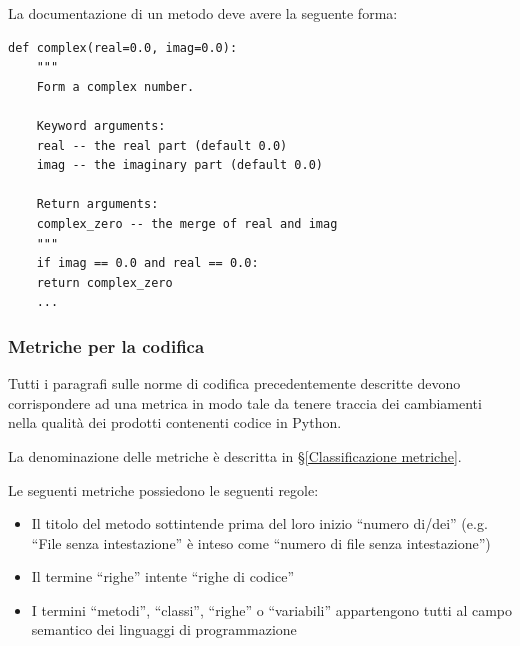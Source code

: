         La documentazione di un metodo deve avere la seguente forma:
\begin{verbatim}
def complex(real=0.0, imag=0.0):
    """
    Form a complex number.

    Keyword arguments:
    real -- the real part (default 0.0)
    imag -- the imaginary part (default 0.0)

    Return arguments:
    complex_zero -- the merge of real and imag
    """
    if imag == 0.0 and real == 0.0:
    return complex_zero
    ...
\end{verbatim}



        \subsubsection{Metriche per la codifica}\label{PP:Sviluppo:MetricheCodifica}
        Tutti i paragrafi sulle norme di codifica precedentemente descritte devono corrispondere ad una metrica in modo tale da tenere traccia dei cambiamenti nella qualità dei prodotti contenenti codice in Python.

        La denominazione delle metriche è descritta in \S\ref{Classificazione metriche}.

        Le seguenti metriche possiedono le seguenti regole:
        \begin{itemize}
            \item Il titolo del metodo sottintende prima del loro inizio ``numero di/dei'' (e.g. ``File senza intestazione'' è inteso come ``numero di file senza intestazione'')
            \item Il termine ``righe'' intente ``righe di codice''
            \item I termini ``metodi'', ``classi'', ``righe'' o ``variabili'' appartengono tutti al campo semantico dei linguaggi di programmazione
        \end{itemize}

